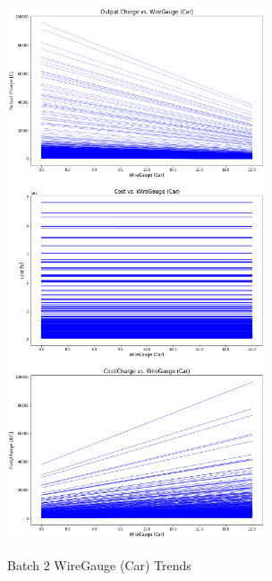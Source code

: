 \begin{figure}
    \begin{center}
    \includegraphics[width=3in]{fig25.png}
    \end{center}
    \renewcommand{\baselinestretch}{1}
    \small\normalsize
    \begin{quote}
    \caption[Batch 2 WireGauge (Car) Trends	]{Batch 2 WireGauge (Car) Trends	} \label{fig: f25}
    \end{quote}
\end{figure}

